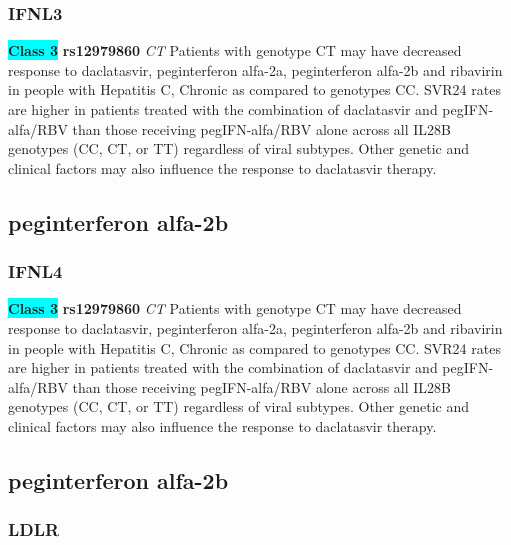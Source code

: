 \documentclass{book}
\begin{document}
\subsubsection{ IFNL3 }

\begin{center}
\textbf{\colorbox{cyan} {Class 3}} \textbf{ rs12979860 } \textit{ CT }
Patients with genotype CT may have decreased response to daclatasvir, peginterferon alfa-2a, peginterferon alfa-2b and ribavirin in people with Hepatitis C, Chronic as compared to genotypes CC. SVR24 rates are higher in patients treated with the combination of daclatasvir and pegIFN-alfa/RBV than those receiving pegIFN-alfa/RBV alone across all IL28B genotypes (CC, CT, or TT) regardless of viral subtypes. Other genetic and clinical factors may also influence the response to daclatasvir therapy.


\end{center}\subsection{ peginterferon alfa-2b }


\subsubsection{ IFNL4 }

\begin{center}
\textbf{\colorbox{cyan} {Class 3}} \textbf{ rs12979860 } \textit{ CT }
Patients with genotype CT may have decreased response to daclatasvir, peginterferon alfa-2a, peginterferon alfa-2b and ribavirin in people with Hepatitis C, Chronic as compared to genotypes CC. SVR24 rates are higher in patients treated with the combination of daclatasvir and pegIFN-alfa/RBV than those receiving pegIFN-alfa/RBV alone across all IL28B genotypes (CC, CT, or TT) regardless of viral subtypes. Other genetic and clinical factors may also influence the response to daclatasvir therapy.


\end{center}\subsection{ peginterferon alfa-2b }


\subsubsection{ LDLR }
\end{document}
